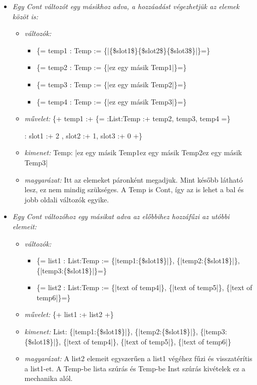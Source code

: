 {\begin{itemize}
\item \emph{ Egy Cont változót egy másikhoz adva, a hozzáadást végezhetjük az elemek közöt is:}
\begin{itemize}
\item \emph{változók:}
\begin{itemize}
\item \{= temp1 : Temp  := \{|\{\$slot1\$\}\{\$slot2\$\}\{\$slot3\$\}|\}=\}
\item \{= temp2 : Temp  := \{|ez egy másik Temp1|\}=\}
\item \{= temp3 : Temp  := \{|ez egy másik Temp2|\}=\}
\item \{= temp4 : Temp  := \{|ez egy másik Temp3|\}=\}
\end{itemize}
\item \emph{művelet:}
\{+ temp1 :+ \{= :List:Temp :+ temp2, temp3, temp4 =\}

: slot1 :+ 2 , slot2 :+ 1, slot3 :+ 0   +\} 
\item \emph{kimenet:}
Temp: {|ez egy másik Temp1ez egy másik Temp2ez egy másik Temp3|}
\item \emph{magyarázat:}
Itt az elemeket páronként megadjuk.
Mint később látható lesz, ez nem mindig szükséges.
A Temp is Cont, így az is lehet a bal és jobb oldali változók egyike.
\end{itemize}

\item \emph{ Egy Cont változóhoz egy másikat adva az előbbihez hozzáfűzi az utóbbi elemeit:}
\begin{itemize}
\item \emph{változók:}
\begin{itemize}
\item \{= list1 : List:Temp  := \{|temp1:\{\$slot1\$\}|\}, \{|temp2:\{\$slot1\$\}|\}, \{|temp3:\{\$slot1\$\}|\}=\}
\item \{= list2 : List:Temp  := \{|text of temp4|\}, \{|text of temp5|\}, \{|text of temp6|\}=\}
\end{itemize}
\item \emph{művelet:}
\{+ list1 :+ list2 +\}
\item \emph{kimenet:}
List: \{|temp1:\{\$slot1\$\}|\}, \{|temp2:\{\$slot1\$\}|\}, \{|temp3:\{\$slot1\$\}|\}, \{|text of temp4|\}, \{|text of temp5|\}, \{|text of temp6|\}
\item \emph{magyarázat:}
A list2 elemeit egyszerűen a list1 végéhez fűzi és visszatérítis a list1-et.
A Temp-be lista szúrás és Temp-be Inst szúrás kivételek ez a mechanika alól.
\end{itemize}


\end{itemize}}
